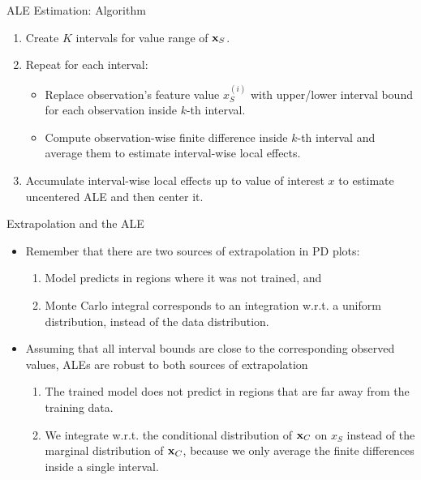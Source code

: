 \documentclass[11pt,compress,t,notes=noshow, aspectratio=169, xcolor=table]{beamer}
\begin{document}
\begin{frame}{ALE Estimation: Algorithm}

\begin{enumerate}
	\item Create $K$ intervals for value range of $\xv_S$.
	\item Repeat for each interval: %
	  \begin{itemize}
	  \item Replace observation's feature value $x_S^{(i)}$ with upper/lower interval bound for each observation inside $k$-th interval.
	  \item Compute observation-wise finite difference inside $k$-th interval and average them to estimate interval-wise local effects.
	  \end{itemize}
  \item Accumulate interval-wise local effects up to value of interest $x$ to estimate uncentered ALE and then center it.
\end{enumerate}

\end{frame}

\begin{frame}{Extrapolation and the ALE}
\begin{itemize}
\item Remember that there are two sources of extrapolation in PD plots:
  \begin{enumerate}
  \item Model predicts in regions where it was not trained, and
  \item Monte Carlo integral corresponds to an integration w.r.t. a uniform distribution, instead of the data distribution.
  \end{enumerate}
\item Assuming that all interval bounds are close to the corresponding observed values, ALEs are robust to both sources of extrapolation
  \begin{enumerate}
    \item The trained model does not predict in regions that are far away from the training data. %
    \item We integrate w.r.t. the conditional distribution of $\xv_C$ on $x_S$ instead of the marginal distribution of $\xv_C$, because we only average the finite differences inside a single interval.
  \end{enumerate}
\end{itemize}
\end{frame}
\end{document}
